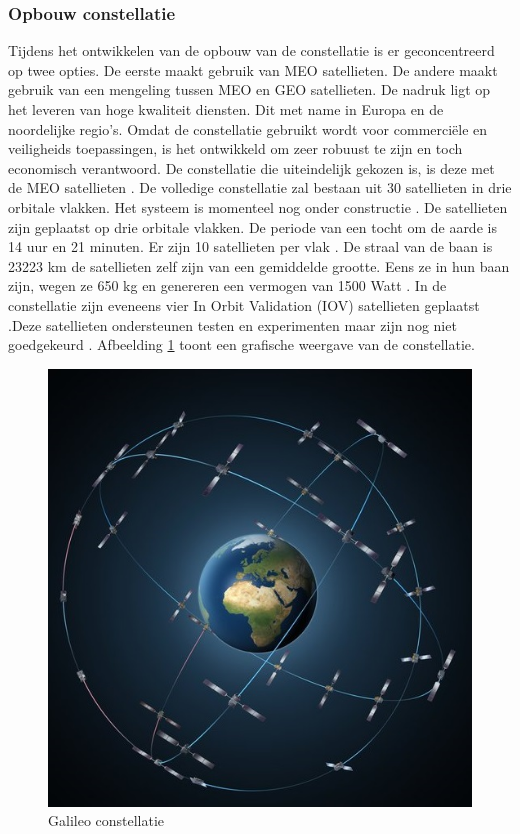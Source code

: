 \subsubsection{Opbouw constellatie}
Tijdens het ontwikkelen van de opbouw van de constellatie is er geconcentreerd op twee opties. De eerste maakt gebruik van MEO satellieten. De andere maakt gebruik van een mengeling tussen MEO en GEO satellieten. De nadruk ligt op het leveren van hoge kwaliteit diensten. Dit met name in Europa en de noordelijke regio's. Omdat de constellatie gebruikt wordt voor commerci\"ele en veiligheids toepassingen, is het ontwikkeld om zeer robuust te zijn en toch economisch verantwoord. De constellatie die uiteindelijk gekozen is, is deze met de MEO satellieten \cite{LBibGalileo2}. De volledige constellatie zal bestaan  uit 30 satellieten in drie orbitale vlakken. Het systeem is momenteel nog onder constructie \cite{LBibGNSS4}. De satellieten zijn geplaatst op drie orbitale vlakken. De periode van een tocht om de aarde is 14 uur en 21 minuten. Er zijn 10 satellieten per vlak \cite{LBibGNSS6}. De straal van de baan is 23223 km de satellieten zelf zijn van een gemiddelde grootte. Eens ze in hun baan zijn, wegen ze 650 kg en genereren een vermogen van 1500 Watt \cite{LBibGalileo2}. In de constellatie zijn eveneens vier In Orbit Validation (IOV) satellieten geplaatst \cite{LBibBeiDou3,LBibPPP2}.Deze satellieten ondersteunen testen en experimenten maar zijn nog niet goedgekeurd \cite{LBibGNSS9}. Afbeelding \ref{imgGalileo} toont een grafische weergave van de constellatie.

\begin{figure}[hpb]
	\includegraphics[scale=1.75]{Galileo.jpg}
	\caption{Galileo constellatie \cite{LImgGalileo}}
	\label{imgGalileo}
\end{figure} 

